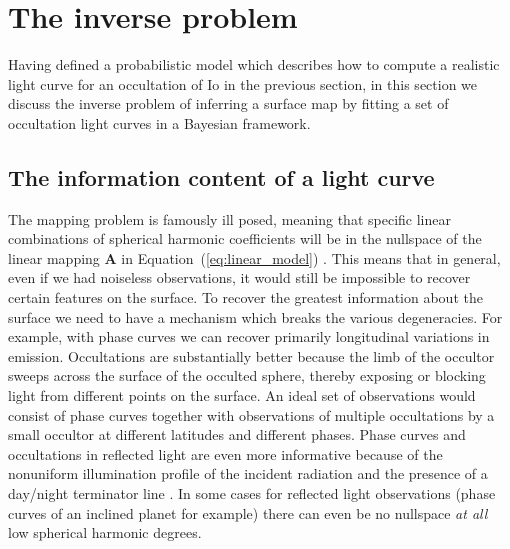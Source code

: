 \documentclass[linenumbers,modern]{aastex62}
\begin{document}
\section{The inverse problem}
\label{sec:inverse_problem}
Having defined a probabilistic model which describes how to compute a realistic light curve for an occultation of Io in the previous section, in this section we discuss the inverse problem of inferring a surface map by fitting a set of occultation light curves in a Bayesian framework.

\subsection{The information content of a light curve}
\label{ssec:information_content}
The mapping problem is famously ill posed, meaning that specific linear combinations of spherical harmonic coefficients will be in the nullspace of the linear mapping  $\mathbf{A}$ in Equation~(\ref{eq:linear_model}) \citep{luger2021}.
This means that in general, even if we had noiseless observations, it would still be impossible to recover certain features on the surface.
To recover the greatest information about the surface we need to have a mechanism which breaks the various degeneracies.
For example, with phase curves we can recover primarily longitudinal variations in emission.
Occultations are substantially better because the limb of the occultor sweeps across the surface of the occulted sphere, thereby exposing or blocking light from different points on the surface.
An ideal set of observations would consist of phase curves together with observations of multiple occultations by a small occultor at different latitudes and different phases.
Phase curves and occultations in reflected light are even more informative because of the nonuniform illumination profile of the incident radiation and the presence of a day/night terminator line \citep{luger2021b}.
In some cases for reflected light observations (phase curves of an inclined planet for example) there can even be no nullspace \emph{at all} low spherical harmonic degrees.
\end{document}
